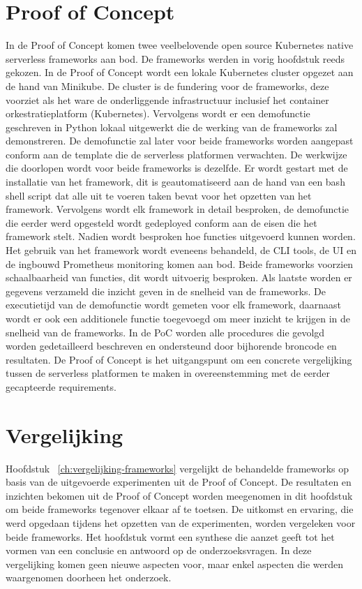 \section{Proof of Concept}
In de Proof of Concept komen twee veelbelovende open source Kubernetes native serverless frameworks aan bod. De frameworks werden in vorig hoofdstuk reeds gekozen. In de Proof of Concept wordt een lokale Kubernetes cluster opgezet aan de hand van Minikube. De cluster is de fundering voor de frameworks, deze voorziet als het ware de onderliggende infrastructuur inclusief het container orkestratieplatform (Kubernetes). Vervolgens wordt er een demofunctie geschreven in Python lokaal uitgewerkt die de werking van de frameworks zal demonstreren. De demofunctie zal later voor beide frameworks worden aangepast conform aan de template die de serverless platformen verwachten. De werkwijze die doorlopen wordt voor beide frameworks is dezelfde. Er wordt gestart met de installatie van het framework, dit is geautomatiseerd aan de hand van een bash shell script dat alle uit te voeren taken bevat voor het opzetten van het framework. Vervolgens wordt elk framework in detail besproken, de demofunctie die eerder werd opgesteld wordt gedeployed conform aan de eisen die het framework stelt. Nadien wordt besproken hoe functies uitgevoerd kunnen worden. Het gebruik van het framework wordt eveneens behandeld, de CLI tools, de UI en de ingbouwd Prometheus monitoring komen aan bod. Beide frameworks voorzien schaalbaarheid van functies, dit wordt uitvoerig besproken. Als laatste worden er gegevens verzameld die inzicht geven in de snelheid van de frameworks. De executietijd van de demofunctie wordt gemeten voor elk framework, daarnaast wordt er ook een additionele functie toegevoegd om meer inzicht te krijgen in de snelheid van de frameworks. In de PoC worden alle procedures die gevolgd worden gedetailleerd beschreven en ondersteund door bijhorende broncode en resultaten. De Proof of Concept is het uitgangspunt om een concrete vergelijking tussen de serverless platformen te maken in overeenstemming met de eerder gecapteerde requirements.

\section{Vergelijking}
Hoofdstuk ~\ref{ch:vergelijking-frameworks} vergelijkt de behandelde frameworks op basis van de uitgevoerde experimenten uit de Proof of Concept. De resultaten en inzichten bekomen uit de Proof of Concept worden meegenomen in dit hoofdstuk om beide frameworks tegenover elkaar af te toetsen. De uitkomst en ervaring, die werd opgedaan tijdens het opzetten van de experimenten, worden vergeleken voor beide frameworks. Het hoofdstuk vormt een synthese die aanzet geeft tot het vormen van een conclusie en antwoord op de onderzoeksvragen. In deze vergelijking komen geen nieuwe aspecten voor, maar enkel aspecten die werden waargenomen doorheen het onderzoek.
